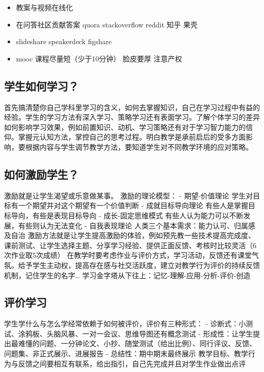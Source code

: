 \documentclass[]{tufte-book}
\providecommand{\tightlist}{%
  \setlength{\itemsep}{0pt}\setlength{\parskip}{0pt}}
\begin{document}
\begin{itemize}
\tightlist
\item
  教案与视频在线化
\item
  在问答社区贡献答案 quora stackoverflow reddit 知乎 果壳
\item
  slideshare speakerdeck figshare
\item
  mooc 课程尽量短（少于10分钟） 脸皮要厚 注意产权
\end{itemize}

\hypertarget{ux5b66ux751fux5982ux4f55ux5b66ux4e60}{%
\subsection{学生如何学习？}\label{ux5b66ux751fux5982ux4f55ux5b66ux4e60}}

首先搞清楚你自己学科里学习的含义，如何去掌握知识，自己在学习过程中有益的经验。学生的学习方法有深入学习、策略学习还有表面学习。了解个体学习的差异如何影响学习效果，例如前置知识、动机、学习策略还有对于学习智力能力的信仰。掌握元认知方法，掌控自己的思考过程。明白教学是承前启后的受多方面影响，要根据内容与学生调节教学方法，要知道学生对不同教学环境的应对策略。

\hypertarget{ux5982ux4f55ux6fc0ux52b1ux5b66ux751f}{%
\subsection{如何激励学生？}\label{ux5982ux4f55ux6fc0ux52b1ux5b66ux751f}}

激励就是让学生渴望或乐意做某事。
激励的理论模型：
- 期望-价值理论 学生对目标有一个期望并对这个期望有一个价值判断
- 成就目标导向理论 有些人是掌握目标导向，有些是表现目标导向
- 成长-固定思维模式 有些人认为能力可以不断发展，有些则认为无法变化
- 自我表现理论 人类三个基本需求：能力认可、归属感及自治
激励方法就是让学生提高激励的体验，例如预先教一些技术提高完成度、课前测试、让学生选择主题、分享学习经验、提供正面反馈、考核时比较灵活（6次作业取5次成绩）
在教学时要考虑作业与评价方式，学习活动，反馈还有课堂气氛。给予学生主动权，提高存在感与社交活跃度，建立对教学行为评价的持续反馈机制，记住学生的名字\ldots{}
学习金字塔从下往上：记忆-理解-应用-分析-评价-创造

\hypertarget{ux8bc4ux4ef7ux5b66ux4e60}{%
\subsection{评价学习}\label{ux8bc4ux4ef7ux5b66ux4e60}}

学生学什么与怎么学经常依赖于如何被评价，评价有三种形式：
- 诊断式：小测试、涂鸦板、头脑风暴、一对一会议、思维导图还有概念测试
- 形成性：让学生提出最难懂的问题、一分钟论文、小抄、随堂测试（给出比例）、同行评议、反馈、问题集、非正式展示、进展报告
- 总结性：期中期末最终展示
教学目标、教学行为与反馈之间要相互有联系，给出指引，自己先完成并且对学生作业做出点评
\end{document}

